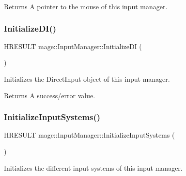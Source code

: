 \begin{DoxyReturn}{Returns}
A pointer to the mouse of this input manager. 
\end{DoxyReturn}
\hypertarget{classmage_1_1_input_manager_af3ca0717e37916463cc4f40c7d174b33}{}\label{classmage_1_1_input_manager_af3ca0717e37916463cc4f40c7d174b33} 
\subsubsection{\texorpdfstring{Initialize\+D\+I()}{InitializeDI()}}
{\footnotesize\ttfamily H\+R\+E\+S\+U\+LT mage\+::\+Input\+Manager\+::\+Initialize\+DI (\begin{DoxyParamCaption}{ }\end{DoxyParamCaption})\hspace{0.3cm}{\ttfamily [protected]}}

Initializes the Direct\+Input object of this input manager.

\begin{DoxyReturn}{Returns}
A success/error value. 
\end{DoxyReturn}
\hypertarget{classmage_1_1_input_manager_a34f114c4c667a4a14ce8236b35d308d8}{}\label{classmage_1_1_input_manager_a34f114c4c667a4a14ce8236b35d308d8} 
\subsubsection{\texorpdfstring{Initialize\+Input\+Systems()}{InitializeInputSystems()}}
{\footnotesize\ttfamily H\+R\+E\+S\+U\+LT mage\+::\+Input\+Manager\+::\+Initialize\+Input\+Systems (\begin{DoxyParamCaption}{ }\end{DoxyParamCaption})\hspace{0.3cm}{\ttfamily [protected]}}

Initializes the different input systems of this input manager. \hypertarget{classmage_1_1_input_manager_a4d2af7a8760b1bc19ef0b642ba7a351c}{}\label{classmage_1_1_input_manager_a4d2af7a8760b1bc19ef0b642ba7a351c} 
